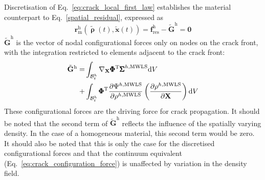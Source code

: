 \documentclass[twocolumn]{svjour3}
\begin{document}
Discretisation of Eq.~\ref{eq:crack_local_first_law} establishes the material counterpart to Eq.~\ref{spatial_residual}, expressed as
\begin{equation}
\label{material_residual}
\mathbf{r}_\textrm{m}^\textrm{h}(\tilde{\pmb\uprho}(t), \tilde{\mathbf{x}}(t)) = \mathbf{f}^\textrm{h}_\textrm{res}-\tilde{\mathbf{G}}^\textrm{h}=\mathbf{0}
\end{equation}
$\tilde{\mathbf{G}}^\textrm{h}$ is the vector of nodal configurational forces only on nodes on the crack front, with the integration restricted to elements adjacent to the crack front:
\begin{equation}
\begin{aligned}
	\tilde{\mathbf{G}}^\textrm{h} =&
	\int_{\mathcal{B}^h_t}
		\nabla_\mathbf{X}\pmb{\Phi}^\textrm{T} {\pmb\Sigma}^{h,\textrm{MWLS}}
	\textrm{d}V \\
	+&
	\int_{\mathcal{B}^h_t}
		\pmb{\Phi}^\textrm{T} \dfrac{\partial {\Psi}^{h,\textrm{MWLS}} }{\partial \rho^{h,\rm{MWLS}}}
		\left(
			\frac{\partial 
			\rho^{h,\textrm{MWLS}}}{\partial \mathbf{X}}
		\right)
	\textrm{d}V
	\label{eq:mat_int_front}
	\end{aligned}
\end{equation}
These configurational forces are the driving force for crack propagation. It should be noted that the second term of $\tilde{\mathbf{G}}^\textrm{h}$ reflects the influence of the spatially varying density. In the case of a homogeneous material, this second term would be zero. It should also be noted that this is only the case for the discretised configurational forces and that the continuum equivalent (Eq.~\ref{eq:crack_configuration_force}) is unaffected by variation in the density field.
\end{document}
